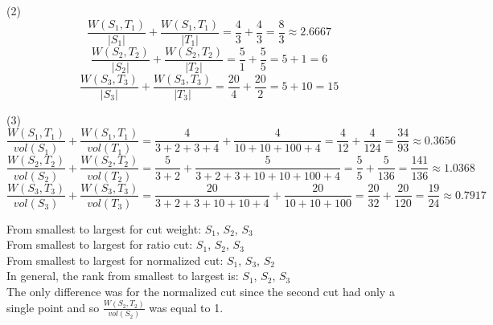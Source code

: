 \documentclass{article}
\begin{document}
(2)
\begin{equation*}
  \frac{W(S_1, T_1)}{|S_1|} + \frac{W(S_1, T_1)}{|T_1|} = \frac{4}{3}
    + \frac{4}{3} = \frac{8}{3} \approx 2.6667
\end{equation*}
\begin{equation*}
  \frac{W(S_2, T_2)}{|S_2|} + \frac{W(S_2, T_2)}{|T_2|} = \frac{5}{1}
    + \frac{5}{5} = 5 + 1 = 6
\end{equation*}
\begin{equation*}
  \frac{W(S_3, T_3)}{|S_3|} + \frac{W(S_3, T_3)}{|T_3|} = \frac{20}{4}
    + \frac{20}{2} = 5 + 10 = 15
\end{equation*}

(3)
\begin{equation*}
  \frac{W(S_1, T_1)}{vol(S_1)} + \frac{W(S_1, T_1)}{vol(T_1)} =
    \frac{4}{3 + 2 + 3 + 4} + \frac{4}{10 + 10 + 100 + 4} =
    \frac{4}{12} + \frac{4}{124} = \frac{34}{93} \approx 0.3656
\end{equation*}
\begin{equation*}
  \frac{W(S_2, T_2)}{vol(S_2)} + \frac{W(S_2, T_2)}{vol(T_2)} =
    \frac{5}{3 + 2} + \frac{5}{3 + 2 + 3 + 10 + 10 + 100 + 4} =
    \frac{5}{5} + \frac{5}{136} = \frac{141}{136} \approx 1.0368
\end{equation*}
\begin{equation*}
  \frac{W(S_3, T_3)}{vol(S_3)} + \frac{W(S_3, T_3)}{vol(T_3)} =
    \frac{20}{3 + 2 + 3 + 10 + 10 + 4} + \frac{20}{10 + 10 + 100} =
    \frac{20}{32} + \frac{20}{120} = \frac{19}{24}
    \approx 0.7917
\end{equation*}

From smallest to largest for cut weight: $S_1$, $S_2$, $S_3$ \\
From smallest to largest for ratio cut: $S_1$, $S_2$, $S_3$ \\
From smallest to largest for normalized cut: $S_1$, $S_3$, $S_2$ \\
In general, the rank from smallest to largest is: $S_1$, $S_2$, $S_3$ \\
The only difference was for the normalized cut since the second cut
had only a single point and so $\frac{W(S_2, T_2)}{vol(S_2)}$ was equal
to 1.
\end{document}
